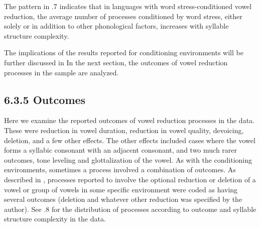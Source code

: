   The pattern in .7 indicates that in languages with word stress-conditioned vowel reduction, the average number of processes conditioned by word stress, either solely or in addition to other phonological factors, increases with syllable structure complexity.



  The implications of the results reported for conditioning environments will be further discussed in  In the next section, the outcomes of vowel reduction processes in the sample are analyzed.


\subsection{6.3.5 Outcomes}

  Here we examine the reported outcomes of vowel reduction processes in the data. These were reduction in vowel duration, reduction in vowel quality, devoicing, deletion, and a few other effects. The other effects included cases where the vowel forms a syllabic consonant with an adjacent consonant, and two much rarer outcomes, tone leveling and glottalization of the vowel. As with the conditioning environments, sometimes a process involved a combination of outcomes. As described in , processes reported to involve the optional reduction or deletion of a vowel or group of vowels in some specific environment were coded as having several outcomes (deletion and whatever other reduction was specified by the author). See .8 for the distribution of processes according to outcome and syllable structure complexity in the data.






